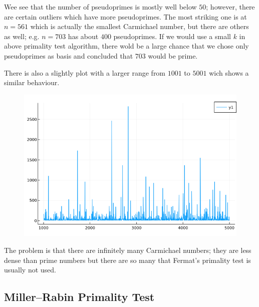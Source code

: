 Wee see that the number of pseudoprimes is mostly well below $50$; however, there are certain outliers which have more pseudoprimes. The most striking one is at $n=561$ which is actually the smallest Carmichael number, but there are others as well; e.g. $n = 703$ has about $400$ pseudoprimes. If we would use a small $k$ in above primality test algorithm, there wold be a large chance that we chose only pseudoprimes as basis and concluded that $703$ would be prime.

There is also a slightly plot with a larger range from $1001$ to $5001$ wich shows a similar behaviour.

\begin{figure}[H]
    \centering
    \includegraphics[scale=0.6]{images/2021-04-06-pseudo_primes_2.png}
\end{figure}

The problem is that there are infinitely many Carmichael numbers; they are less dense than prime numbers but there are so many that Fermat's primality test is usually not used.

\subsection{Miller–Rabin Primality Test}



